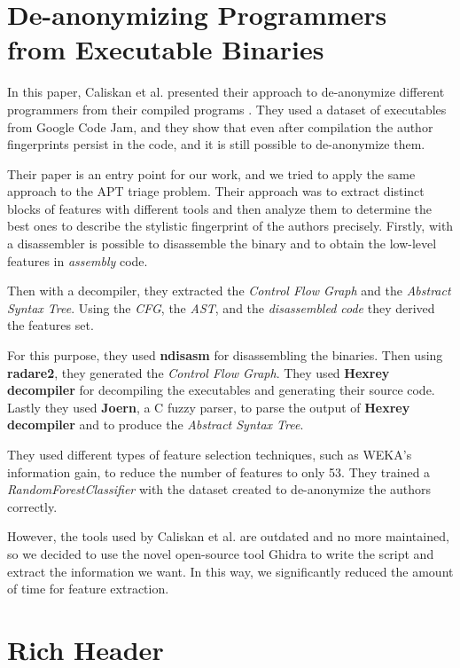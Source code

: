 \section{De-anonymizing Programmers from Executable Binaries}
In this paper, Caliskan et al. presented their approach to de-anonymize different programmers from their compiled programs \cite{caliskan2015anonymizing}. They used a dataset of executables from Google Code Jam, and they show that even after compilation the author fingerprints persist in the code, and it is still possible to de-anonymize them.

Their paper is an entry point for our work, and we tried to apply the same approach to the APT triage problem. Their approach was to extract distinct blocks of features with different tools and then analyze them to determine the best ones to describe the stylistic fingerprint of the authors precisely. Firstly,  with a disassembler is possible to disassemble the binary and to obtain the low-level features in \textit{assembly} code.

Then with a decompiler, they extracted the \textit{Control Flow Graph} and the \textit{Abstract Syntax Tree}. Using the \textit{CFG}, the \textit{AST}, and the \textit{disassembled code} they derived the features set.

For this purpose, they used \textbf{ndisasm} for disassembling the binaries. Then using \textbf{radare2}, they generated the \textit{Control Flow Graph}. They used \textbf{Hexrey decompiler} for decompiling the executables and generating their source code. Lastly they used \textbf{Joern}, a C fuzzy parser, to parse the output of \textbf{Hexrey decompiler} and to produce the \textit{Abstract Syntax Tree}.

They used different types of feature selection techniques, such as WEKA's information gain, to reduce the number of features to only 53. They trained a \textit{RandomForestClassifier} with the dataset created to de-anonymize the authors correctly.

However, the tools used by Caliskan et al. are outdated and no more maintained, so we decided to use the novel open-source tool Ghidra to write the script and extract the information we want. In this way, we significantly reduced the amount of time for feature extraction.



\section{Rich Header}

